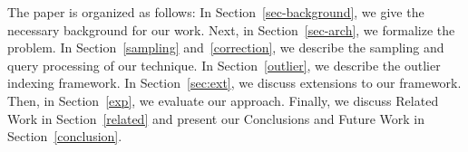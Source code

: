 The paper is organized as follows: 
In Section~\ref{sec-background}, we give the necessary background for our work.
Next, in Section~\ref{sec-arch}, we formalize the problem.
In Section~\ref{sampling} and~\ref{correction}, we describe the sampling and query processing of our technique.
In Section~\ref{outlier}, we describe the outlier indexing framework.
In Section~\ref{sec:ext}, we discuss extensions to our framework.
Then, in Section~\ref{exp}, we evaluate our approach.
Finally, we discuss Related Work in Section~\ref{related} and present our Conclusions and Future Work in Section~\ref{conclusion}.
